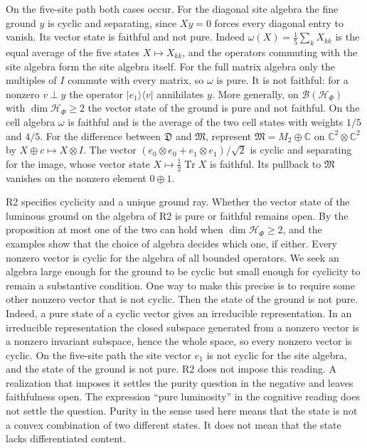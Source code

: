 \documentclass[11pt]{article}
\theoremstyle{definition}
\DeclareMathOperator{\Tr}{Tr}
\newcommand{\C}{\mathbb C}
\newcommand{\ket}[1]{\lvert #1\rangle}
\newcommand{\bra}[1]{\langle #1\rvert}
\begin{document}
On the five-site path both cases occur. For the diagonal site algebra the fine ground $y$ is cyclic and separating, since $Xy=0$ forces every diagonal entry to vanish. Its vector state is faithful and not pure. Indeed $\omega(X)=\tfrac15\sum_kX_{kk}$ is the equal average of the five states $X\mapsto X_{kk}$, and the operators commuting with the site algebra form the site algebra itself. For the full matrix algebra only the multiples of $I$ commute with every matrix, so $\omega$ is pure. It is not faithful: for a nonzero $v\perp y$ the operator $\ket{e_1}\!\bra{v}$ annihilates $y$. More generally, on $\mathcal B(\mathcal H_\Phi)$ with $\dim\mathcal H_\Phi\geq2$ the vector state of the ground is pure and not faithful. On the cell algebra $\omega$ is faithful and is the average of the two cell states with weights $1/5$ and $4/5$. For the difference between $\mathfrak D$ and $\mathfrak M$, represent $\mathfrak M=M_2\oplus\C$ on $\C^2\otimes\C^2$ by $X\oplus c\mapsto X\otimes I$. The vector $(e_0\otimes e_0+e_1\otimes e_1)/\sqrt2$ is cyclic and separating for the image, whose vector state $X\mapsto\tfrac12\Tr X$ is faithful. Its pullback to $\mathfrak M$ vanishes on the nonzero element $0\oplus1$.

R2 specifies cyclicity and a unique ground ray. Whether the vector state of the luminous ground on the algebra of R2 is pure or faithful remains open. By the proposition at most one of the two can hold when $\dim\mathcal H_\Phi\geq2$, and the examples show that the choice of algebra decides which one, if either. Every nonzero vector is cyclic for the algebra of all bounded operators. We seek an algebra large enough for the ground to be cyclic but small enough for cyclicity to remain a substantive condition. One way to make this precise is to require some other nonzero vector that is not cyclic. Then the state of the ground is not pure. Indeed, a pure state of a cyclic vector gives an irreducible representation. In an irreducible representation the closed subspace generated from a nonzero vector is a nonzero invariant subspace, hence the whole space, so every nonzero vector is cyclic. On the five-site path the site vector $e_1$ is not cyclic for the site algebra, and the state of the ground is not pure. R2 does not impose this reading. A realization that imposes it settles the purity question in the negative and leaves faithfulness open. The expression ``pure luminosity'' in the cognitive reading does not settle the question. Purity in the sense used here means that the state is not a convex combination of two different states. It does not mean that the state lacks differentiated content.
\end{document}
